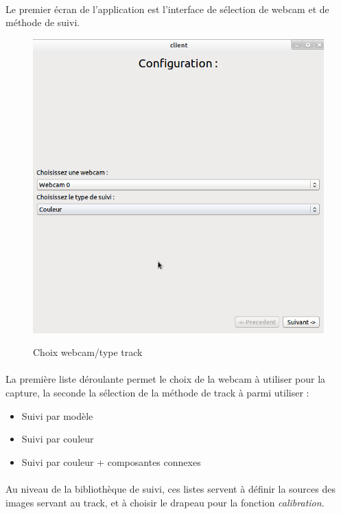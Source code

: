 \documentclass{report}
\begin{document}
				\paragraph{}
				Le premier écran de l'application est l'interface de sélection de webcam et de méthode de suivi.\\
				\begin{figure}[!h]
						\centering
						\includegraphics[scale=0.35]{../images/Capture6.png}\\
						\caption{Choix webcam/type track}
						\label{Choix webcam/type track}
				\end{figure}
				\paragraph{}
				La première liste déroulante permet le choix de la webcam à utiliser pour la capture, la seconde la sélection de la méthode de track à parmi utiliser :
				\begin{itemize}
					\item Suivi par modèle
					\item Suivi par couleur
					\item Suivi par couleur + composantes connexes
				\end{itemize}
				\paragraph{}
				Au niveau de la bibliothèque de suivi, ces listes servent à définir la sources des images servant au track, et à choisir le drapeau pour la fonction \textit{calibration}.
				\newpage
\end{document}
